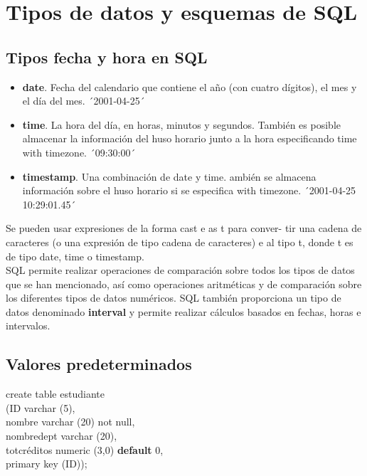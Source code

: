 \documentclass{article}
\begin{document}
\newpage

\section{Tipos de datos y esquemas de SQL}
\subsection{Tipos fecha y hora en SQL}
\begin{itemize}
\item \textbf{date}. Fecha del calendario que contiene el año (con cuatro dígitos), el mes y el día del mes. ´2001-04-25´

\item \textbf{time}. La hora del día, en horas, minutos y segundos.
También es posible almacenar la información del huso horario
junto a la hora especificando time with timezone. ´09:30:00´

\item \textbf{timestamp}. Una combinación de date y time. ambién se almacena información sobre el huso horario si se especifica with timezone. ´2001-04-25 10:29:01.45´
\end{itemize}

Se pueden usar expresiones de la forma cast e as t para conver-
tir una cadena de caracteres (o una expresión de tipo cadena de
caracteres) e al tipo t, donde t es de tipo date, time o timestamp. \\

SQL permite realizar operaciones de comparación sobre todos
los tipos de datos que se han mencionado, así como operaciones
aritméticas y de comparación sobre los diferentes tipos de datos
numéricos. SQL también proporciona un tipo de datos denominado
\textbf{interval} y permite realizar cálculos basados en fechas, horas e intervalos. 

\subsection{Valores predeterminados}
create table estudiante \\
(ID varchar (5), \\
nombre varchar (20) not null, \\
nombredept varchar (20), \\
totcréditos numeric (3,0) \textbf{default} 0, \\
primary key (ID)); \\
\end{document}
